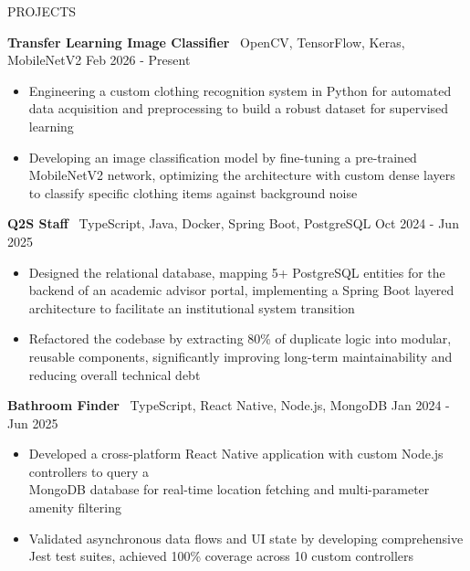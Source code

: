 \documentclass{resume} %
\begin{document}
\begin{rSection}{PROJECTS}

\textbf{Transfer Learning Image Classifier} \textbar\ OpenCV, TensorFlow, Keras, MobileNetV2 \hfill Feb 2026 - Present
 \vspace{-.5em}
 \begin{itemize}
   \itemsep  -6pt {}
   \item Engineering a custom clothing recognition system in Python for automated data acquisition and preprocessing
   to build a robust dataset for supervised learning
   \item Developing an image classification model by fine-tuning a pre-trained MobileNetV2 network,
 optimizing the architecture with custom dense layers to classify specific clothing items against background noise
\end{itemize}

\textbf{Q2S Staff} \textbar\  TypeScript, Java, Docker, Spring Boot, PostgreSQL \hfill Oct 2024 - Jun 2025
 \vspace{-.5em} 
 \begin{itemize}
   \itemsep  -6pt {}
   \item Designed the relational database, mapping 5+ PostgreSQL entities for the backend of an academic advisor portal,
   implementing a Spring Boot layered architecture to facilitate an institutional system transition 
   \item Refactored the codebase by extracting 80\% of duplicate logic into modular, reusable components, significantly
   improving long-term maintainability and reducing overall technical debt
 \end{itemize}

\textbf{Bathroom Finder} \textbar\ TypeScript, React Native, Node.js, MongoDB \hfill Jan 2024 - Jun 2025
 \vspace{-.5em}
 \begin{itemize}
   \itemsep  -6pt {}
   \item Developed a cross-platform React Native application with custom Node.js controllers to query a \\
    MongoDB database for real-time location fetching and multi-parameter amenity filtering  
   \item Validated asynchronous data flows and UI state by developing comprehensive Jest test suites, 
   achieved 100\% coverage across 10 custom controllers

 \end{itemize}

\end{rSection} 
\end{document}
